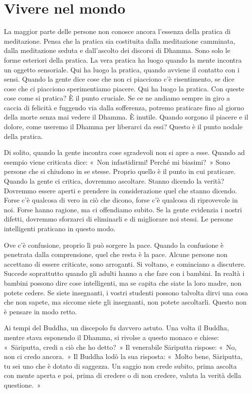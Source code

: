 \chapter{Vivere nel mondo}

La maggior parte delle persone non conosce ancora l'essenza della
pratica di meditazione. Pensa che la pratica sia costituita dalla
meditazione camminata, dalla meditazione seduta e dall'ascolto dei
discorsi di Dhamma. Sono solo le forme esteriori della pratica. La vera
pratica ha luogo quando la mente incontra un oggetto sensoriale. Qui ha
luogo la pratica, quando avviene il contatto con i sensi. Quando la
gente dice cose che non ci piacciono c'è risentimento, se dice cose che
ci piacciono sperimentiamo piacere. Qui ha luogo la pratica. Con queste
cose come si pratica? È il punto cruciale. Se ce ne andiamo sempre in
giro a caccia di felicità e fuggendo via dalla sofferenza, potremo
praticare fino al giorno della morte senza mai vedere il Dhamma. È
inutile. Quando sorgono il piacere e il dolore, come useremo il Dhamma
per liberarci da essi? Questo è il punto nodale della pratica.

Di solito, quando la gente incontra cose sgradevoli non si apre a esse.
Quando ad esempio viene criticata dice: «~Non infastidirmi! Perché mi
biasimi?~» Sono persone che si chiudono in se stesse. Proprio quello è il
punto in cui praticare. Quando la gente ci critica, dovremmo ascoltare.
Stanno dicendo la verità? Dovremmo essere aperti e prendere in
considerazione quel che stanno dicendo. Forse c'è qualcosa di vero in
ciò che dicono, forse c'è qualcosa di riprovevole in noi. Forse hanno
ragione, ma ci offendiamo subito. Se la gente evidenzia i nostri
difetti, dovremmo sforzarci di eliminarli e di migliorare noi stessi. Le
persone intelligenti praticano in questo modo.

Ove c'è confusione, proprio lì può sorgere la pace. Quando la confusione
è penetrata dalla comprensione, quel che resta è la pace. Alcune persone
non accettano di essere criticate, sono arroganti. Si voltano, e
cominciano a discutere. Succede soprattutto quando gli adulti hanno a
che fare con i bambini. In realtà i bambini possono dire cose
intelligenti, ma se capita che siate la loro madre, non potete cedere.
Se siete insegnanti, i vostri studenti possono talvolta dirvi una cosa
che non sapete, ma siccome siete gli insegnanti, non potete ascoltarli.
Questo non è pensare in modo retto.

Ai tempi del Buddha, un discepolo fu davvero astuto. Una volta il
Buddha, mentre stava esponendo il Dhamma, si rivolse a questo monaco e
chiese: «~Sāriputta, credi a ciò che ho detto?~» Il venerabile Sāriputta
rispose: «~No, non ci credo ancora.~» Il Buddha lodò la sua risposta:
«~Molto bene, Sāriputta, tu sei uno che è dotato di saggezza. Un saggio
non crede subito, prima ascolta con mente aperta e poi, prima di credere
o di non credere, valuta la verità della questione.~»


